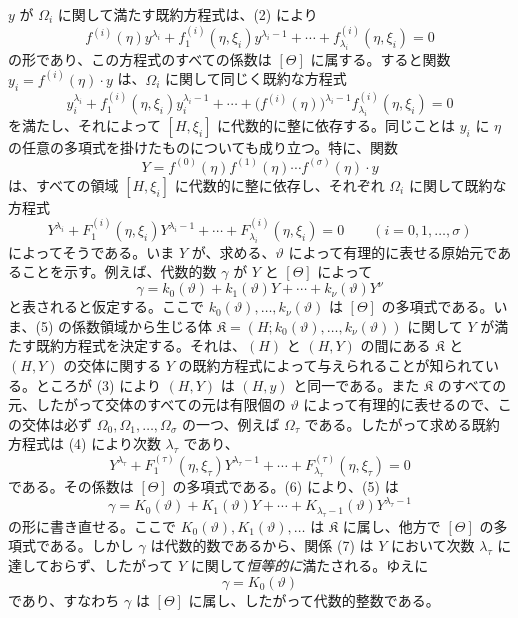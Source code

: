 \documentclass[11pt]{article}
\begin{document}
$y$ が $\Omega_i$ に関して満たす既約方程式は、(2) により
\[
 f^{(i)}(\eta)y^{\lambda_i}+f_1^{(i)}(\eta,\xi_i)y^{\lambda_i-1}
+\cdots+f_{\lambda_i}^{(i)}(\eta,\xi_i)=0
\]
の形であり、この方程式のすべての係数は $[\Theta]$ に属する。すると関数 $y_i=f^{(i)}(\eta)\cdot y$ は、$\Omega_i$ に関して同じく既約な方程式
\[
 y_i^{\lambda_i}+f_1^{(i)}(\eta,\xi_i)y_i^{\lambda_i-1}
+\cdots+\bigl(f^{(i)}(\eta)\bigr)^{\lambda_i-1}
 f_{\lambda_i}^{(i)}(\eta,\xi_i)=0
\]
を満たし、それによって $[H,\xi_i]$ に代数的に整に依存する。同じことは $y_i$ に $\eta$ の任意の多項式を掛けたものについても成り立つ。特に、関数
\begin{equation}
Y=f^{(0)}(\eta)f^{(1)}(\eta)\cdots f^{(\sigma)}(\eta)\cdot y
\tag{3}
\end{equation}
は、すべての領域 $[H,\xi_i]$ に代数的に整に依存し、それぞれ $\Omega_i$ に関して既約な方程式
\begin{equation}
Y^{\lambda_i}+F_1^{(i)}(\eta,\xi_i)Y^{\lambda_i-1}
+\cdots+F_{\lambda_i}^{(i)}(\eta,\xi_i)=0
\qquad (i=0,1,\ldots,\sigma)
\tag{4}
\end{equation}
によってそうである。いま $Y$ が、求める、$\vartheta$ によって有理的に表せる原始元であることを示す。例えば、代数的数 $\gamma$ が $Y$ と $[\Theta]$ によって
\begin{equation}
\gamma=k_0(\vartheta)+k_1(\vartheta)Y+\cdots+k_\nu(\vartheta)Y^\nu
\tag{5}
\end{equation}
と表されると仮定する。ここで $k_0(\vartheta),\ldots,k_\nu(\vartheta)$ は $[\Theta]$ の多項式である。いま、(5) の係数領域から生じる体 $\mathfrak K=(H;k_0(\vartheta),\ldots,k_\nu(\vartheta))$ に関して $Y$ が満たす既約方程式を決定する。それは、$(H)$ と $(H,Y)$ の間にある $\mathfrak K$ と $(H,Y)$ の交体に関する $Y$ の既約方程式によって与えられることが知られている。ところが (3) により $(H,Y)$ は $(H,y)$ と同一である。また $\mathfrak K$ のすべての元、したがって交体のすべての元は有限個の $\vartheta$ によって有理的に表せるので、この交体は必ず $\Omega_0,\Omega_1,\ldots,\Omega_\sigma$ の一つ、例えば $\Omega_\tau$ である。したがって求める既約方程式は (4) により次数 $\lambda_\tau$ であり、
\begin{equation}
Y^{\lambda_\tau}+F_1^{(\tau)}(\eta,\xi_\tau)Y^{\lambda_\tau-1}
+\cdots+F_{\lambda_\tau}^{(\tau)}(\eta,\xi_\tau)=0
\tag{6}
\end{equation}
である。その係数は $[\Theta]$ の多項式である。(6) により、(5) は
\begin{equation}
\gamma=K_0(\vartheta)+K_1(\vartheta)Y+\cdots+
K_{\lambda_\tau-1}(\vartheta)Y^{\lambda_\tau-1}
\tag{7}
\end{equation}
の形に書き直せる。ここで $K_0(\vartheta),K_1(\vartheta),\ldots$ は $\mathfrak K$ に属し、他方で $[\Theta]$ の多項式である。しかし $\gamma$ は代数的数であるから、関係 (7) は $Y$ において次数 $\lambda_\tau$ に達しておらず、したがって $Y$ に関して\emph{恒等的に}満たされる。ゆえに
\[
 \gamma=K_0(\vartheta)
\]
であり、すなわち $\gamma$ は $[\Theta]$ に属し、したがって代数的整数である。
\end{document}
